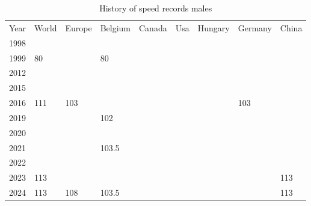\begin{table}[]
    \begin{tabular}{lllllllll}
        Year & World & Europe & Belgium & Canada & Usa & Hungary & Germany & China \\
        1998 &       &        &         &        &     &         &         &       \\
        1999 & 80    &        & 80      &        &     &         &         &       \\
        2012 &       &        &         &        &     &         &         &       \\
        2015 &       &        &         &        &     &         &         &       \\
        2016 & 111   & 103    &         &        &     &         & 103     &       \\
        2019 &       &        & 102     &        &     &         &         &       \\
        2020 &       &        &         &        &     &         &         &       \\
        2021 &       &        & 103.5   &        &     &         &         &       \\
        2022 &       &        &         &        &     &         &         &       \\
        2023 & 113   &        &         &        &     &         &         & 113   \\
        2024 & 113   & 108    & 103.5   &        &     &         &         & 113
    \end{tabular}
    \caption{History of speed records males}
    \label{tbl:speed-records-male}
\end{table}

